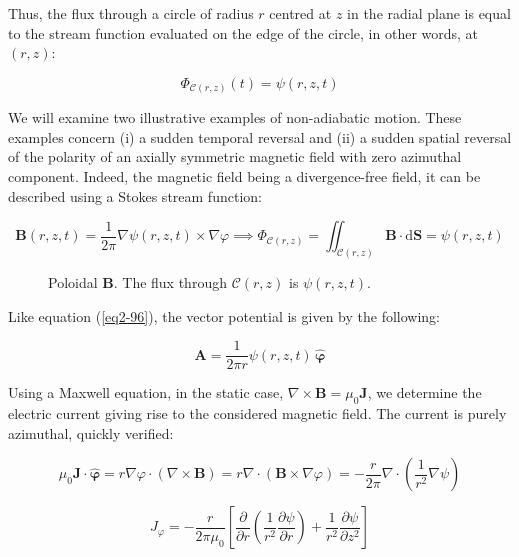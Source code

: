 Thus, the flux through a circle of radius $r$ centred at $z$ in the radial plane is equal to the stream function evaluated on the edge of the circle, in other words, at $(r,z)$:

\begin{equation}
    \Phi_{\mathcal{C}(r,z)}(t)=\psi(r,z,t)
\end{equation}

We will examine two illustrative examples of non-adiabatic motion. These examples concern (i) a sudden temporal reversal and (ii) a sudden spatial reversal of the polarity of an axially symmetric magnetic field with zero azimuthal component. Indeed, the magnetic field being a divergence-free field, it can be described using a Stokes stream function:

\begin{equation}
    \mathbf{B}(r,z,t)=\frac{1}{2\pi}\nabla\psi(r,z,t)\times\nabla\varphi\implies\Phi_{\mathcal{C}(r,z)}=\iint_{\mathcal{C}(r,z)}\mathbf{B}\cdot\mathrm{d}\mathbf{S}=\psi(r,z,t)
\end{equation}

\begin{figure}
    \centering
    \scalebox{1}{}
    \caption{Poloidal $\mathbf{B}$. The flux through $\mathcal{C}(r,z)$ is $\psi(r,z,t)$.}
    \label{fig2-2}
\end{figure}

Like equation (\ref{eq2-96}), the vector potential is given by the following:

\begin{equation}
    \mathbf{A}=\frac{1}{2\pi r}\psi(r,z,t)\,\boldsymbol{\hat{\varphi}}
\end{equation}

Using a Maxwell equation, in the static case, $\nabla\times\mathbf{B}=\mu_0\mathbf{J}$, we determine the electric current giving rise to the considered magnetic field. The current is purely azimuthal, quickly verified:

\begin{equation}
    \mu_0\mathbf{J}\cdot\boldsymbol{\hat{\varphi}}=r\nabla\varphi\cdot(\nabla\times\mathbf{B})=r\nabla\cdot(\mathbf{B}\times\nabla\varphi)=-\frac{r}{2\pi}\nabla\cdot\left(\frac{1}{r^2}\nabla\psi\right)
\end{equation}

\begin{equation}
    \label{eq2-108}
    J_\varphi=-\frac{r}{2\pi\mu_0}\left[\frac{\partial}{\partial r}\left(\frac{1}{r^2}\frac{\partial\psi}{\partial r}\right)+\frac{1}{r^2}\frac{\partial\psi}{\partial z^2}\right]
\end{equation}

